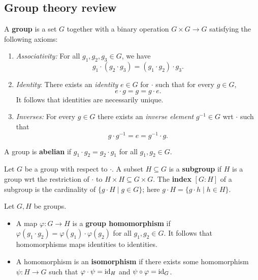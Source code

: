 \subsection{Group theory review}
\begin{definition}[Group]
    A \textbf{group} is a set $G$ together with a binary operation $G \times G \to G$ satisfying the following axioms:
    \begin{enumerate}[label=(\alph*)]
    \setlength\itemsep{-.2em}
        \item \emph{Associativity:} For all $g_1,g_2,g_3 \in G$, we have \[
                g_1 \cdot (g_2 \cdot g_3) = (g_1 \cdot g_2) \cdot g_3.
        \] 
            \item \emph{Identity}: There exists an \emph{identity} $e \in G$ for $\cdot $ such that for every $g \in G$, \[
            e \cdot g = g = g \cdot e.
            \] It follows that identities are necessarily unique.
        \item \emph{Inverses:} For every $g \in G$ there exists an \emph{inverse element} $g^{-1} \in G$ wrt $\cdot $ such that \[
        g \cdot  g^{-1} = e = g^{-1} \cdot  g.
        \] 
    \end{enumerate}
    A group is \textbf{abelian} if $g_1 \cdot g_2 = g_2 \cdot g_1$ for all $g_1,g_2 \in G$.
\end{definition}
\begin{definition}[Subgroup]
    Let $G$ be a group with respect to $\cdot $. A subset $H \subseteq G$ is a \textbf{subgroup} if $H$ is a group wrt the restriction of $\cdot $ to $H \times  H \subseteq G \times G$. The \textbf{index} $[G : H]$ of a subgroup is the cardinality of $\{g \cdot H \mid g \in G\} $; here $g \cdot  H = \{g \cdot h \mid h \in H\} $.
\end{definition}
\begin{definition}
   Let $G,H$ be groups.
   \begin{itemize}
   \setlength\itemsep{-.2em}
       \item A map $\varphi \colon G \to H$ is a \textbf{group homomorphism} if $\varphi (g_1 \cdot g_2) = \varphi (g_1) \cdot \varphi (g_2)$ for all $g_1,g_2 \in G$. It follows that homomorphisms maps identities to identities.
       \item A homomorphism is an \textbf{isomorphism} if there exists some homomorphism $\psi \colon H \to G$ such that $\varphi  \cdot \psi = \operatorname{id}_H$ and $\psi \circ \varphi = \operatorname{id}_G$.
   \end{itemize}
\end{definition}
